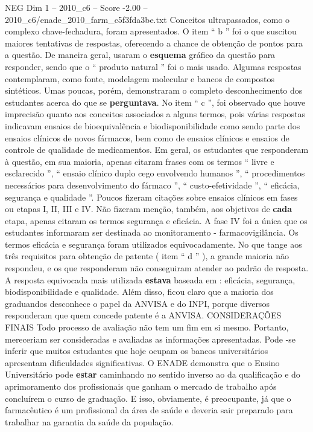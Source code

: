 \begin{textsample}{NEG Dim 1 – 2010\_c6 – Score -2.00 – 2010\_c6/enade\_2010\_farm\_c5f3fda3be.txt}
Conceitos ultrapassados, como o complexo chave-fechadura, foram apresentados.
O item “ b ” foi o que suscitou maiores tentativas de respostas, oferecendo a chance de obtenção de pontos para a questão.
De maneira geral, usaram o \textbf{esquema} gráfico da questão para responder, sendo que o “ produto natural ” foi o mais usado.
Algumas respostas contemplaram, como fonte, modelagem molecular e bancos de compostos sintéticos.
Umas poucas, porém, demonstraram o completo desconhecimento dos estudantes acerca do que se \textbf{perguntava}.
No item “ c ”, foi observado que houve imprecisão quanto aos conceitos associados a alguns termos, pois várias respostas indicavam ensaios de bioequivalência e biodisponibilidade como sendo parte dos ensaios clínicos de novos fármacos, bem como de ensaios clínicos e ensaios de controle de qualidade de medicamentos.
Em geral, os estudantes que responderam à questão, em sua maioria, apenas citaram frases com os termos “ livre e esclarecido ”, “ ensaio clínico duplo cego envolvendo humanos ”, “ procedimentos necessários para desenvolvimento do fármaco ”, “ custo-efetividade ”, “ eficácia, segurança e qualidade ”.
Poucos fizeram citações sobre ensaios clínicos em fases ou etapas I, II, III e IV.
Não fizeram menção, também, aos objetivos de \textbf{cada} etapa, apenas citaram os termos segurança e eficácia.
A fase IV foi a única que os estudantes informaram ser destinada ao monitoramento - farmacovigilância.
Os termos eficácia e segurança foram utilizados equivocadamente.
No que tange aos três requisitos para obtenção de patente ( item “ d ” ), a grande maioria não respondeu, e os que responderam não conseguiram atender ao padrão de resposta.
A resposta equivocada mais utilizada \textbf{estava} baseada em : eficácia, segurança, biodisponibilidade e qualidade.
Além disso, ficou claro que a maioria dos graduandos desconhece o papel da ANVISA e do INPI, porque diversos responderam que quem concede patente é a ANVISA.
CONSIDERAÇÕES FINAIS Todo processo de avaliação não tem um fim em si mesmo.
Portanto, mereceriam ser consideradas e avaliadas as informações apresentadas.
Pode -se inferir que muitos estudantes que hoje ocupam os bancos universitários apresentam dificuldades significativas.
O ENADE demonstra que o Ensino Universitário pode \textbf{estar} caminhando no sentido inverso ao da qualificação e do aprimoramento dos profissionais que ganham o mercado de trabalho após concluírem o curso de graduação.
E isso, obviamente, é preocupante, já que o farmacêutico é um profissional da área de saúde e deveria sair preparado para trabalhar na garantia da saúde da população.

\end{textsample}
